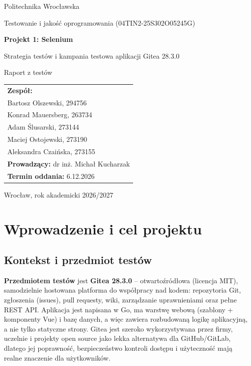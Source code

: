 \documentclass[11pt,a4paper]{article}
\begin{document}
\begin{titlepage}
\centering
{\large Politechnika Wrocławska\par}
\vspace{0.5cm}
{\large Testowanie i jakość oprogramowania (04TIN2-25S302O05245G)\par}
\vspace{3cm}
{\Huge\bfseries Projekt 1: Selenium\par}
\vspace{0.6cm}
{\LARGE Strategia testów i kampania testowa aplikacji Gitea 28.3.0\par}
\vspace{0.6cm}
{\large Raport z testów\par}
\vfill
{\large
\begin{tabular}{l}
\textbf{Zespół:} \\
{Bartosz Olszewski, 294756} \\
{Konrad Mauersberg, 263734} \\
{Adam Ślusarski, 273144} \\
{Maciej Ostojewski, 273190} \\
{Aleksandra Czaińska, 273155} \\[1em]
\textbf{Prowadzący:} dr inż. Michał Kucharzak \\
\textbf{Termin oddania:} 6.12.2026
\end{tabular}\par}
\vspace{2cm}
{\large Wrocław, rok akademicki 2026/2027\par}
\end{titlepage}

\tableofcontents
\newpage

\section{Wprowadzenie i cel projektu}

\subsection{Kontekst i przedmiot testów}
\textbf{Przedmiotem testów} jest \textbf{Gitea 28.3.0} -- otwartoźródłowa (licencja MIT),
samodzielnie hostowana platforma do współpracy nad kodem: repozytoria Git, zgłoszenia (issues),
pull requesty, wiki, zarządzanie uprawnieniami oraz pełne REST API. Aplikacja jest napisana
w Go, ma warstwę webową (szablony + komponenty Vue) i bazę danych, a więc zawiera rozbudowaną
logikę aplikacyjną, a nie tylko statyczne strony. Gitea jest szeroko wykorzystywana przez firmy,
uczelnie i projekty open source jako lekka alternatywa dla GitHub/GitLab, dlatego jej poprawność,
bezpieczeństwo kontroli dostępu i użyteczność mają realne znaczenie dla użytkowników.
\end{document}
